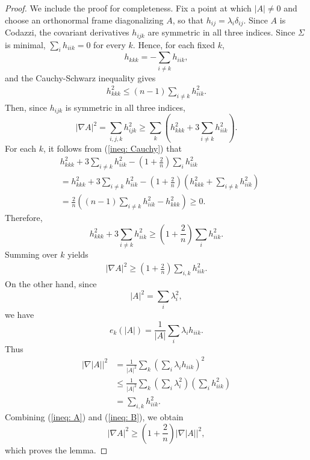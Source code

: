 \documentclass[amssymb,amstex,amsmath,11pt]{article}
\numberwithin{equation}{section}
\theoremstyle{plain}
\theoremstyle{definition}
\theoremstyle{remark}
\begin{document}
\begin{proof}
We include the proof for completeness. Fix a point at which $|A|\neq0$ and choose an orthonormal frame diagonalizing $A$, so that $h_{ij}=\lambda_i\delta_{ij}$. Since $A$ is Codazzi, the covariant derivatives $h_{ijk}$ are symmetric in all three indices. Since $\Sigma$ is minimal, $\sum_i h_{iik}=0$ for every $k$. Hence, for each fixed $k$,
$$
h_{kkk}=-\sum_{i\neq k}h_{iik},
$$
and the Cauchy-Schwarz inequality gives
\begin{align}
h_{kkk}^2\le (n-1)\sum_{i\neq k}h_{iik}^2. \label{ineq: Cauchy}
\end{align}
Then, since $h_{ijk}$ is symmetric in all three indices,
$$
|\nabla A|^2
=
\sum_{i,j,k}h_{ijk}^2
\geq
\sum_k
\left(
h_{kkk}^2
+
3\sum_{i\neq k}h_{iik}^2
\right).
$$
For each $k$, it follows from (\ref{ineq: Cauchy}) that
\begin{align*}
&h_{kkk}^2+3\sum_{i\neq k}h_{iik}^2
-
\left(1+\frac{2}{n}\right)
\sum_i h_{iik}^2\\
&=
h_{kkk}^2+3\sum_{i\neq k}h_{iik}^2
-
\left(1+\frac{2}{n}\right)
\left(
h_{kkk}^2+\sum_{i\neq k}h_{iik}^2
\right)\\
&=
\frac{2}{n}
\left(
(n-1)\sum_{i\neq k}h_{iik}^2-h_{kkk}^2
\right)
\geq0.
\end{align*}
Therefore,
$$
h_{kkk}^2+3\sum_{i\neq k}h_{iik}^2
\geq
\left(1+\frac{2}{n}\right)
\sum_i h_{iik}^2.
$$
Summing over $k$ yields
\begin{align}
|\nabla A|^2 \geq \left(1+\frac{2}{n}\right) \sum_{i,k}h_{iik}^2. \label{ineq: A}
\end{align}
On the other hand, since
$$
|A|^2=\sum_i\lambda_i^2,
$$
we have
$$
e_k(|A|)
=
\frac{1}{|A|}
\sum_i\lambda_i h_{iik}.
$$
Thus
\begin{align}
|\nabla|A||^2 &= \frac{1}{|A|^2}\sum_k\left(\sum_i\lambda_i h_{iik}\right)^2 \nonumber \\
&\leq \frac{1}{|A|^2} \sum_k\left(\sum_i\lambda_i^2\right)\left(\sum_i h_{iik}^2\right) \nonumber\\
&=\sum_{i,k}h_{iik}^2. \label{ineq: B}
\end{align}
Combining (\ref{ineq: A}) and (\ref{ineq: B}), we obtain
$$
|\nabla A|^2
\geq
\left(1+\frac{2}{n}\right)|\nabla|A||^2,
$$
which proves the lemma.
















\end{proof}
\end{document}
